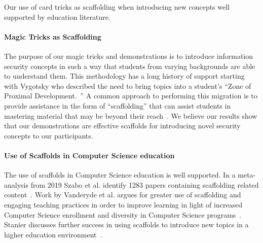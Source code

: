 Our use of card tricks as scaffolding when introducing new concepts well
supported by education literature.

\paragraph{Magic Tricks as Scaffolding}
The purpose of our magic tricks and demonstrations is to introduce
information security concepts in such a way that students from varying
backgrounds are able to understand them.  This methodology has a long history of
support starting with Vygotsky who described the need to bring topics into a
student's ``Zone of Proximal Development.~\cite{vygotsky1978}''
A common approach to performing this migration is to provide assistance in the
form of ``scaffolding'' that can assist students in mastering material that may
be beyond their reach~\cite{wood1976role}.  We believe our results show that our
demonstrations are effective scaffolds for introducing novel security concepts
to our participants.

\paragraph{Use of Scaffolds in Computer Science education}
The use of scaffolds in Computer Science education is well supported. In a
meta-analysis from 2019 Szabo et
al. identify 1283 papers containing scaffolding related
content~\cite{szabometa}.  Work by Vanderyde et al. argues for greater use of scaffolding and
engaging teaching practices in order to improve learning in light of increased
Computer Science enrollment and diversity in Computer Science
programs~\cite{vanderhydescaffolding}.  Stanier discusses further success in
using scaffolds to introduce new topics in a higher education
environment~\cite{stanierhighered}.
